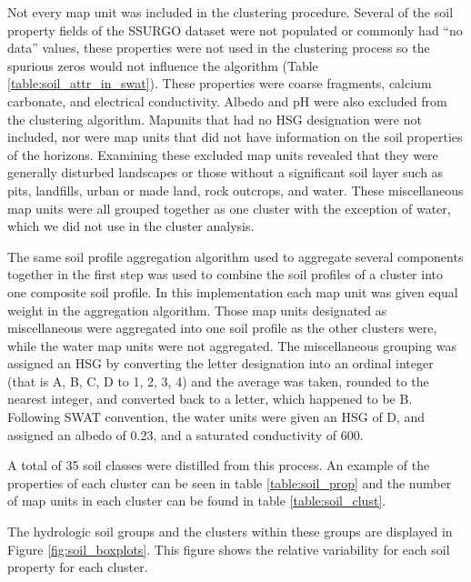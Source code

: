 Not every map unit was included in the clustering procedure. Several of the soil property fields of the SSURGO dataset were not populated or commonly had ``no data'' values, these properties were not used in the
clustering process so the spurious zeros would not influence the algorithm (Table \ref{table:soil_attr_in_swat}). These properties were coarse fragments, calcium carbonate, and electrical conductivity. Albedo and pH were also excluded from the clustering algorithm. Mapunits that had no HSG designation were not included, nor were map units that did not have information on the soil properties of the horizons. Examining these excluded map units revealed that they were generally disturbed landscapes or those without a significant soil layer such as pits, landfills, urban or made land, rock outcrops, and water. These miscellaneous map units were all grouped together as one cluster with the exception of water, which we did not use in the cluster analysis.

The same soil profile aggregation algorithm \citep{beaudette_algorithms_2013}
used to aggregate several components together in the first step was used to combine the soil profiles of a cluster into one
composite soil profile. In this implementation each map unit was given equal
weight in the aggregation algorithm. Those map units designated as miscellaneous
were aggregated into one soil profile as the other clusters were, while the
water map units were not aggregated. The miscellaneous grouping was assigned an
HSG by converting the letter designation into an ordinal
integer (that is A, B, C, D to 1, 2, 3, 4) and the average was taken, rounded to
the nearest integer, and converted back to a letter, which happened to be B. Following SWAT convention, the water units
were given an HSG of D, and assigned an albedo of 0.23, and a saturated conductivity
of 600.

A total of 35 soil classes were distilled from this process. An example of the properties of each cluster can be seen in table \ref{table:soil_prop} and the number of map units in each cluster can be found in table \ref{table:soil_clust}. 

The hydrologic soil groups and the clusters within these groups are displayed in Figure \ref{fig:soil_boxplots}. This figure shows the relative variability for each soil property for each cluster.

